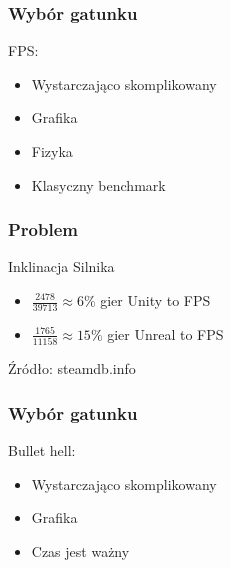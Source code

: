 \documentclass{beamer}
\begin{document}
        \begin{frame}
          \frametitle{Wybór gatunku} 
          FPS: 
            \begin{itemize}
              \item Wystarczająco skomplikowany
              \item Grafika
              \item Fizyka
              \item Klasyczny benchmark 
            \end{itemize}
        \end{frame}
        \begin{frame}
          \frametitle{Problem}
          Inklinacja Silnika \\ 
          \begin{itemize} 
          \item $ \frac{2478}{39713} \approx 6\%  $ gier Unity to FPS \\ 
          \item  $ \frac{1765}{11158} \approx 15\% $ gier Unreal to FPS \\ 
          \end{itemize}
        Źródło: steamdb.info
        \end{frame}

        \begin{frame}
          \frametitle{Wybór gatunku} 
          Bullet hell: 
            \begin{itemize}
              \item Wystarczająco skomplikowany 
              \item Grafika
              \item Czas jest ważny 
            \end{itemize}
        \end{frame}
\end{document}
